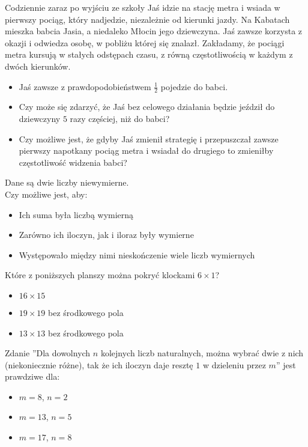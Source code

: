 \documentclass[12pt, a4paper]{article}
\newcommand{\question}[1]{\normalitem \begin{samepage}#1 \end{samepage}}
\newcommand{\cmark}{\textcolor{green}{T}}%
\newcommand{\xmark}{\textcolor{red}{N}}%
\newcommand{\yes}{\rlap{\framebox(15,15)} {\raisebox{2pt}{\large\hspace{-1pt}\cmark}}%
\hspace{3pt}}
\newcommand{\no}{\rlap{\framebox(15,15)} {\raisebox{2pt}{\large\hspace{-1pt}\xmark}}%
\hspace{3pt}}
\begin{document}
\begin{enumerate}
	\question {
		Codziennie zaraz po wyjściu ze szkoły Jaś idzie na stację metra i wsiada w pierwszy pociąg, który nadjedzie, niezależnie od kierunki jazdy. Na Kabatach mieszka babcia Jasia, a
        niedaleko Młocin jego dziewczyna. Jaś zawsze korzysta z okazji i odwiedza osobę, w pobliżu której się znalazł. Zakładamy, że pociągi metra kursują w stałych odstępach czasu, z równą częstotliwością
        w każdym z dwóch kierunków.

		\begin{itemize}
			\item [\no]Jaś zawsze z prawdopodobieństwem $\frac{1}{2}$ pojedzie do babci.
			\item [\yes]Czy może się zdarzyć, że Jaś bez celowego działania będzie jeździł do dziewczyny $5$ razy częściej, niż do babci?
			\item [\yes]Czy możliwe jest, że gdyby Jaś zmienił strategię i przepuszczał zawsze pierwszy napotkany pociąg metra i wsiadał do drugiego to zmieniłby częstotliwość widzenia babci? 
		\end{itemize}
	}
	
	\question {
		Dane są dwie liczby niewymierne.\\ 
		Czy możliwe jest, aby:

		\begin{itemize}
			\item [\yes]Ich suma była liczbą wymierną
			\item [\yes]Zarówno ich iloczyn, jak i iloraz były wymierne
			\item [\yes]Występowało między nimi nieskończenie wiele liczb wymiernych
		\end{itemize}
	}
	
	\question {
		Które z poniższych planszy można pokryć klockami $6 \times 1$?
		
		\begin{itemize}
			\item [\no]$16 \times 15$
            \item [\no]$19 \times 19$ bez środkowego pola
            \item [\yes]$13 \times 13$ bez środkowego pola
		\end{itemize}
	}
	
	\question {
		Zdanie ''Dla dowolnych $n$ kolejnych liczb naturalnych, można wybrać dwie z nich (niekoniecznie różne), tak że ich iloczyn daje resztę $1$ w dzieleniu przez $m$'' jest prawdziwe dla:
		
		\begin{itemize}
			\item [\yes]$m = 8$, $n = 2$
            \item [\no]$m = 13$, $n = 5$
            \item [\yes]$m = 17$, $n = 8$
		\end{itemize}
	}
	

\end{enumerate}
\end{document}

